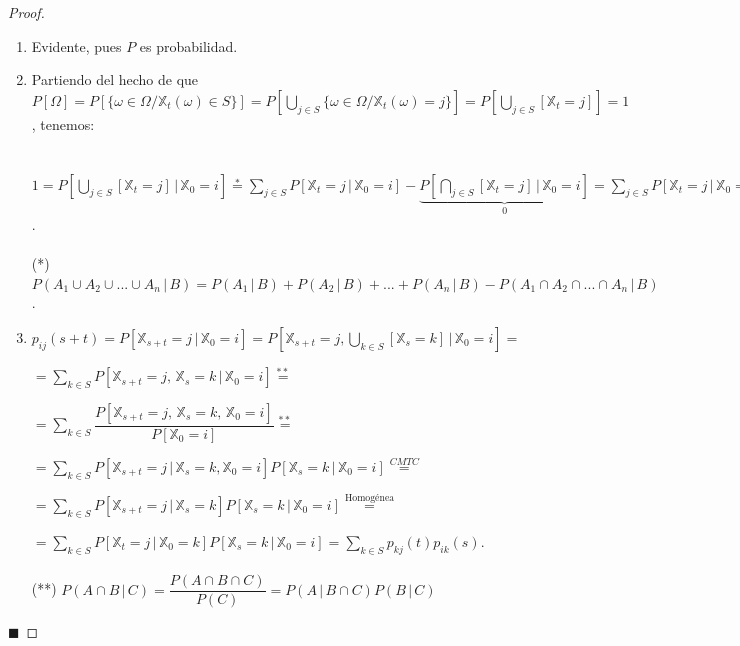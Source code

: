 \documentclass[12pt,a4paper]{article}
\newcommand*{\qed}{\hfill\ensuremath{\blacksquare}}
\begin{document}
\begin{proof}
\begin{enumerate}
\item Evidente, pues $P$ es probabilidad.
\item Partiendo del hecho de que $P[\Omega]=P\left[\{\omega\in\Omega/\mathbb{X}_t(\omega)\in S\}\right]=P\left[\bigcup\limits_{j\in S}\{\omega\in\Omega/\mathbb{X}_t(\omega)=j\}\right]=P\left[\bigcup\limits_{j\in S}[\mathbb{X}_t=j]\right]=1$, tenemos:
\\\\\\
$1=P\left[\bigcup\limits_{j\in S}[\mathbb{X}_t=j]\, | \,\mathbb{X}_0=i\right]\overset{*}{=}\sum\limits_{j\in S}P\left[\mathbb{X}_t=j\, | \,\mathbb{X}_0=i\right]-\underbrace{P\left[\bigcap\limits_{j\in S}[\mathbb{X}_t=j]\, | \,\mathbb{X}_0=i \right]}_{0}=\sum\limits_{j\in S}P\left[\mathbb{X}_t=j\, | \,\mathbb{X}_0=i\right]=\sum\limits_{j\in S}p_{ij}(t)$.
\\\\

(*) $P(A_1\cup A_2\cup ... \cup A_n\, |\, B)=P(A_1\, |\,B)+P(A_2\, |\,B)+...+P(A_n\, |\,B)-P(A_1\cap A_2\cap ... \cap A_n\, |\, B)$.
\item $p_{ij}(s+t)=P\left[\mathbb{X}_{s+t}=j\, | \,\mathbb{X}_0=i\right]=P\left[\mathbb{X}_{s+t}=j, \bigcup\limits_{k\in S}[\mathbb{X}_s=k]\, | \,\mathbb{X}_0=i\right]=$

$=\sum\limits_{k\in S}P\left[\mathbb{X}_{s+t}=j,\,\mathbb{X}_s=k\, | \,\mathbb{X}_0=i\right]\overset{**}{=}$

$=\sum\limits_{k \in S} \dfrac{P[\mathbb{X}_{s+t}=j,\,\mathbb{X}_s=k,\,\mathbb{X}_0=i]}{P[\mathbb{X}_0=i]}\overset{**}{=}$

$=\sum\limits_{k\in S}P\left[\mathbb{X}_{s+t}=j\, | \,\mathbb{X}_s=k, \mathbb{X}_0=i\right]P\left[\mathbb{X}_s=k\, | \,\mathbb{X}_0=i\right]\overset{CMTC}{=}$

$=\sum\limits_{k\in S}P\left[\mathbb{X}_{s+t}=j\, | \,\mathbb{X}_s=k\right]P\left[\mathbb{X}_s=k\, | \,\mathbb{X}_0=i\right]\overset{\text{Homogénea}}{=}$

$=\sum\limits_{k\in S}P\left[\mathbb{X}_t=j\, | \,\mathbb{X}_0=k\right]P\left[\mathbb{X}_s=k\, | \,\mathbb{X}_0=i\right]=\sum\limits_{k\in S}p_{kj}(t)p_{ik}(s)$.
\\\\

(**) $P(A\cap B\, | \, C)=\dfrac{P(A\cap B\cap C)}{P(C)}=P(A\, | \, B\cap C)P(B\, | \,C)$ \\
\end{enumerate}
\qed
\end{proof}
\end{document}
